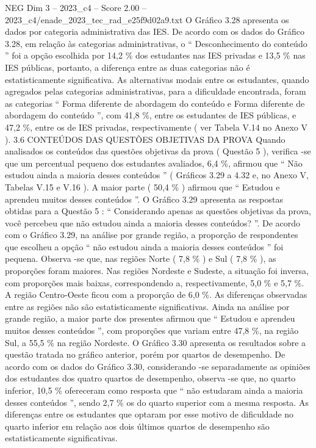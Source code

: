 \begin{textsample}{NEG Dim 3 – 2023\_c4 – Score 2.00 – 2023\_c4/enade\_2023\_tec\_rad\_e25f9d02a9.txt}
O Gráfico 3.28 apresenta os dados por categoria administrativa das IES.
De acordo com os dados do Gráfico 3.28, em relação às categorias administrativas, o “ Desconhecimento do conteúdo ” foi a opção escolhida por 14,2 \% dos estudantes nas IES privadas e 13,5 \% nas IES públicas, portanto, a diferença entre as duas categorias não é estatisticamente significativa.
As alternativas modais entre os estudantes, quando agregados pelas categorias administrativas, para a dificuldade encontrada, foram as categorias “ Forma diferente de abordagem do conteúdo e Forma diferente de abordagem do conteúdo ”, com 41,8 \%, entre os estudantes de IES públicas, e 47,2 \%, entre os de IES privadas, respectivamente ( ver Tabela V.14 no Anexo V ). 3.6 CONTEÚDOS DAS QUESTÕES OBJETIVAS DA PROVA Quando analisados os conteúdos das questões objetivas da prova ( Questão 5 ), verifica -se que um percentual pequeno dos estudantes avaliados, 6,4 \%, afirmou que “ Não estudou ainda a maioria desses conteúdos ” ( Gráficos 3.29 a 4.32 e, no Anexo V, Tabelas V.15 e V.16 ).
A maior parte ( 50,4 \% ) afirmou que “ Estudou e aprendeu muitos desses conteúdos ”.
O Gráfico 3.29 apresenta as respostas obtidas para a Questão 5 : “ Considerando apenas as questões objetivas da prova, você percebeu que não estudou ainda a maioria desses conteúdos? ”.
De acordo com o Gráfico 3.29, na análise por grande região, a proporção de respondentes que escolheu a opção “ não estudou ainda a maioria desses conteúdos ” foi pequena.
Observa -se que, nas regiões Norte ( 7,8 \% ) e Sul ( 7,8 \% ), as proporções foram maiores.
Nas regiões Nordeste e Sudeste, a situação foi inversa, com proporções mais baixas, correspondendo a, respectivamente, 5,0 \% e 5,7 \%.
A região Centro-Oeste ficou com a proporção de 6,0 \%.
As diferenças observadas entre as regiões não são estatisticamente significativas.
Ainda na análise por grande região, a maior parte dos presentes afirmou que “ Estudou e aprendeu muitos desses conteúdos ”, com proporções que variam entre 47,8 \%, na região Sul, a 55,5 \% na região Nordeste.
O Gráfico 3.30 apresenta os resultados sobre a questão tratada no gráfico anterior, porém por quartos de desempenho.
De acordo com os dados do Gráfico 3.30, considerando -se separadamente as opiniões dos estudantes dos quatro quartos de desempenho, observa -se que, no quarto inferior, 10,5 \% ofereceram como resposta que “ não estudaram ainda a maioria desses conteúdos ”, sendo 2,7 \% os do quarto superior com a mesma resposta.
As diferenças entre os estudantes que optaram por esse motivo de dificuldade no quarto inferior em relação aos dois últimos quartos de desempenho são estatisticamente significativas.

\end{textsample}

